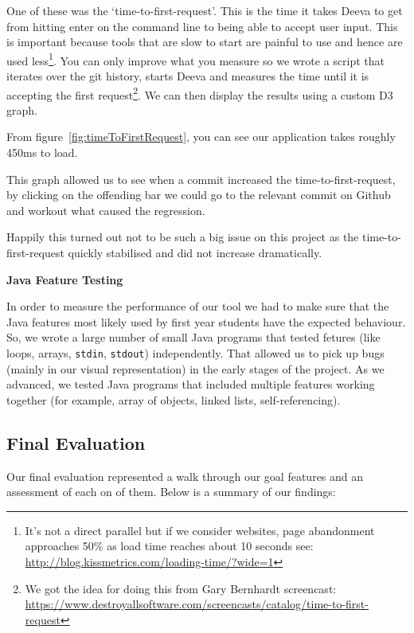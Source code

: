 \documentclass[11pt, a4paper]{article}
\newcommand{\cmd}[1]{{\tt #1}}
\begin{document}
One of these was the `time-to-first-request'.
This is the time it takes Deeva to get from hitting enter on the command line to being able to accept user input.
This is important because tools that are slow to start are painful to use and hence are used less\footnote{It's not a direct parallel but if we consider websites, page abandonment approaches 50\% as load time reaches about 10 seconds see: \url{http://blog.kissmetrics.com/loading-time/?wide=1}}.
You can only improve what you measure so we wrote a script that iterates over the git history, starts Deeva and measures the time until it is accepting the first request\footnote{We got the idea for doing this from Gary Bernhardt screencast: \url{https://www.destroyallsoftware.com/screencasts/catalog/time-to-first-request}}.
We can then display the results using a custom D3 graph.

From figure~\ref{fig:timeToFirstRequest}, you can see our application takes roughly 450ms to load.

This graph allowed us to see when a commit increased the time-to-first-request, by clicking on the offending bar we could go to the relevant commit on Github and workout what caused the regression.

Happily this turned out not to be such a big issue on this project as the time-to-first-request quickly stabilised and did not increase dramatically.

\textbf{Java Feature Testing}

In order to measure the performance of our tool we had to make sure that the Java features most likely used by first year students have the expected behaviour.
So, we wrote a large number of small Java programs that tested fetures (like loops, arrays, \cmd{stdin}, \cmd{stdout}) independently.
That allowed us to pick up bugs (mainly in our visual representation) in the early stages of the project.
As we advanced, we tested Java programs that included multiple features working together (for example, array of objects, linked lists, self-referencing).

\subsection{Final Evaluation}
Our final evaluation represented a walk through our goal features and an assessment of each on of them.
Below is a summary of our findings:
\end{document}
